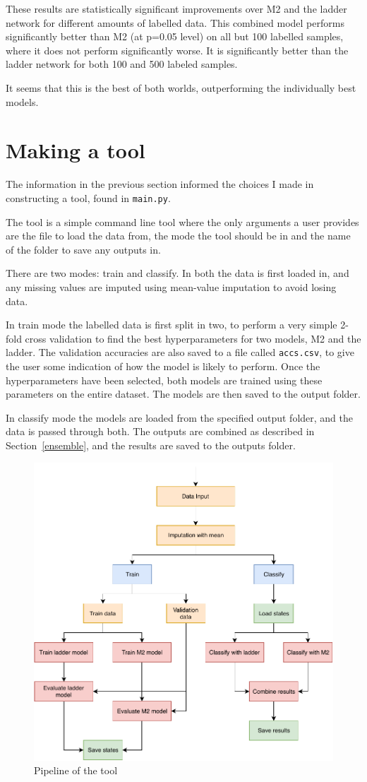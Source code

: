 These results are statistically significant improvements over M2 and the ladder network for different amounts of labelled data.
This combined model performs significantly better than M2 (at p=0.05 level) on all but 100 labelled samples, where it does not 
perform significantly worse. It is significantly better than the ladder network for both 100 and 500 labeled samples. 

It seems that this is the best of both worlds, outperforming the individually best models.

\section{Making a tool} \label{tool}

The information in the previous section informed the choices I made in constructing a tool, found in \texttt{main.py}.

The tool is a simple command line tool where the  only arguments a user provides are the file to load the data 
from, the mode the tool should be in and the name of the folder to save any outputs in.

There are two modes: train and classify. In both the data is first loaded in, and  any missing values are imputed using 
mean-value imputation to avoid losing data.

In train mode the labelled data is first split in two, to perform a very simple 2-fold cross validation to find the best hyperparameters for two 
models, M2 and the ladder. The validation accuracies are also saved to a file called \texttt{accs.csv}, to give the user some indication of
how the model is likely to perform.
Once the hyperparameters have been selected, both models are trained using these parameters on the entire dataset. The models are then 
saved to the output folder.

In classify mode the models are loaded from the specified output folder, and the data is passed through both. The outputs are combined 
as described in Section~\ref{ensemble}, and the results are saved to the outputs folder.

\begin{figure}[H]
  \centering
  \includegraphics[scale=1]{figs/tool.pdf}
  \caption{Pipeline of the tool}
  \label{fig:pipeline}
\end{figure}